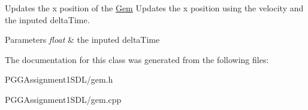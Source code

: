 Updates the x position of the \hyperlink{class_gem}{Gem} Updates the x position using the velocity and the inputed delta\+Time. 
\begin{DoxyParams}{Parameters}
{\em float} & the inputed delta\+Time \\
\hline
\end{DoxyParams}


The documentation for this class was generated from the following files\+:\begin{DoxyCompactItemize}
\item 
P\+G\+G\+Assignment1\+S\+D\+L/gem.\+h\item 
P\+G\+G\+Assignment1\+S\+D\+L/gem.\+cpp\end{DoxyCompactItemize}
